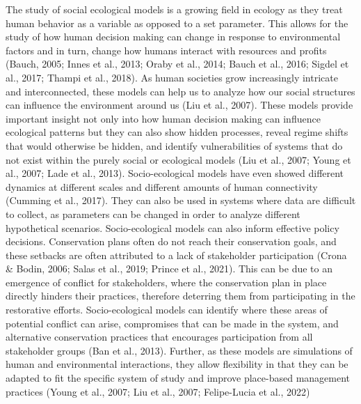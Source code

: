 \documentclass[
]{article}
\begin{document}
The study of social ecological models is a growing field in ecology as they treat human behavior as a variable as opposed to a set parameter. This allows for the study of how human decision making can change in response to environmental factors and in turn, change how humans interact with resources and profits (Bauch, 2005; Innes et al., 2013; Oraby et al., 2014; Bauch et al., 2016; Sigdel et al., 2017; Thampi et al., 2018). As human societies grow increasingly intricate and interconnected, these models can help us to analyze how our social structures can influence the environment around us (Liu et al., 2007). These models provide important insight not only into how human decision making can influence ecological patterns but they can also show hidden processes, reveal regime shifts that would otherwise be hidden, and identify vulnerabilities of systems that do not exist within the purely social or ecological models (Liu et al., 2007; Young et al., 2007; Lade et al., 2013). Socio-ecological models have even showed different dynamics at different scales and different amounts of human connectivity (Cumming et al., 2017). They can also be used in systems where data are difficult to collect, as parameters can be changed in order to analyze different hypothetical scenarios. Socio-ecological models can also inform effective policy decisions. Conservation plans often do not reach their conservation goals, and these setbacks are often attributed to a lack of stakeholder participation (Crona \& Bodin, 2006; Salas et al., 2019; Prince et al., 2021). This can be due to an emergence of conflict for stakeholders, where the conservation plan in place directly hinders their practices, therefore deterring them from participating in the restorative efforts. Socio-ecological models can identify where these areas of potential conflict can arise, compromises that can be made in the system, and alternative conservation practices that encourages participation from all stakeholder groups (Ban et al., 2013). Further, as these models are simulations of human and environmental interactions, they allow flexibility in that they can be adapted to fit the specific system of study and improve place-based management practices (Young et al., 2007; Liu et al., 2007; Felipe-Lucia et al., 2022)
\end{document}
